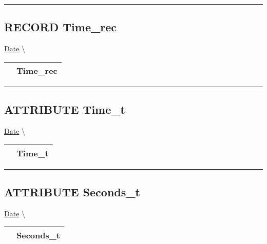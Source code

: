 \par


\rule{\linewidth}{0.5pt}
\subsection*{\textsf{\colorbox{headtoc}{\color{white} RECORD}
Time\_rec}}

\hypertarget{ecldoc:date.time_rec}{}
\hspace{0pt} \hyperlink{ecldoc:Date}{Date} \textbackslash 

{\renewcommand{\arraystretch}{1.5}
\begin{tabularx}{\textwidth}{|>{\raggedright\arraybackslash}l|X|}
\hline
\hspace{0pt}\mytexttt{\color{red} } & \textbf{Time\_rec} \\
\hline
\end{tabularx}
}

\par


\rule{\linewidth}{0.5pt}
\subsection*{\textsf{\colorbox{headtoc}{\color{white} ATTRIBUTE}
Time\_t}}

\hypertarget{ecldoc:date.time_t}{}
\hspace{0pt} \hyperlink{ecldoc:Date}{Date} \textbackslash 

{\renewcommand{\arraystretch}{1.5}
\begin{tabularx}{\textwidth}{|>{\raggedright\arraybackslash}l|X|}
\hline
\hspace{0pt}\mytexttt{\color{red} } & \textbf{Time\_t} \\
\hline
\end{tabularx}
}

\par


\rule{\linewidth}{0.5pt}
\subsection*{\textsf{\colorbox{headtoc}{\color{white} ATTRIBUTE}
Seconds\_t}}

\hypertarget{ecldoc:date.seconds_t}{}
\hspace{0pt} \hyperlink{ecldoc:Date}{Date} \textbackslash 

{\renewcommand{\arraystretch}{1.5}
\begin{tabularx}{\textwidth}{|>{\raggedright\arraybackslash}l|X|}
\hline
\hspace{0pt}\mytexttt{\color{red} } & \textbf{Seconds\_t} \\
\hline
\end{tabularx}
}

